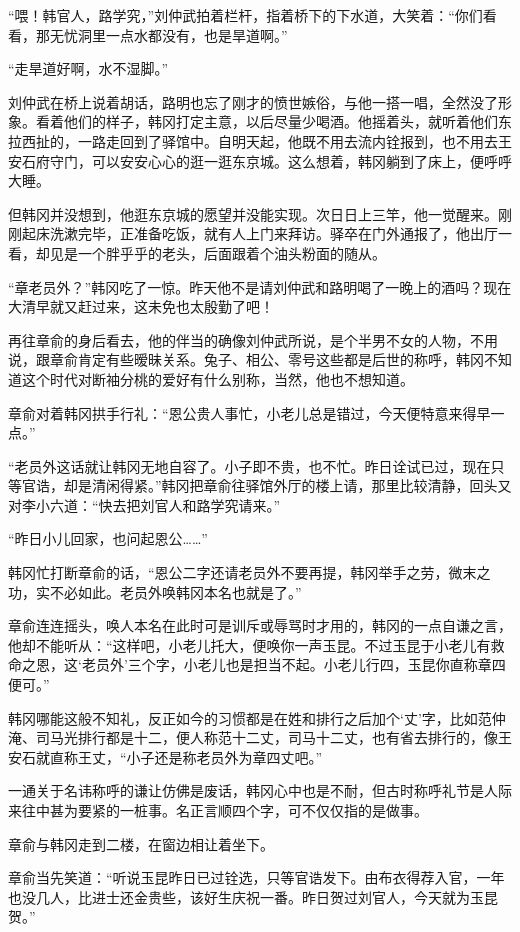 “喂！韩官人，路学究，”刘仲武拍着栏杆，指着桥下的下水道，大笑着：“你们看看，那无忧洞里一点水都没有，也是旱道啊。”

“走旱道好啊，水不湿脚。”

刘仲武在桥上说着胡话，路明也忘了刚才的愤世嫉俗，与他一搭一唱，全然没了形象。看着他们的样子，韩冈打定主意，以后尽量少喝酒。他摇着头，就听着他们东拉西扯的，一路走回到了驿馆中。自明天起，他既不用去流内铨报到，也不用去王安石府守门，可以安安心心的逛一逛东京城。这么想着，韩冈躺到了床上，便呼呼大睡。

但韩冈并没想到，他逛东京城的愿望并没能实现。次日日上三竿，他一觉醒来。刚刚起床洗漱完毕，正准备吃饭，就有人上门来拜访。驿卒在门外通报了，他出厅一看，却见是一个胖乎乎的老头，后面跟着个油头粉面的随从。

“章老员外？”韩冈吃了一惊。昨天他不是请刘仲武和路明喝了一晚上的酒吗？现在大清早就又赶过来，这未免也太殷勤了吧！

再往章俞的身后看去，他的伴当的确像刘仲武所说，是个半男不女的人物，不用说，跟章俞肯定有些暧昧关系。兔子、相公、零号这些都是后世的称呼，韩冈不知道这个时代对断袖分桃的爱好有什么别称，当然，他也不想知道。

章俞对着韩冈拱手行礼：“恩公贵人事忙，小老儿总是错过，今天便特意来得早一点。”

“老员外这话就让韩冈无地自容了。小子即不贵，也不忙。昨日诠试已过，现在只等官诰，却是清闲得紧。”韩冈把章俞往驿馆外厅的楼上请，那里比较清静，回头又对李小六道：“快去把刘官人和路学究请来。”

“昨日小儿回家，也问起恩公……”

韩冈忙打断章俞的话，“恩公二字还请老员外不要再提，韩冈举手之劳，微末之功，实不必如此。老员外唤韩冈本名也就是了。”

章俞连连摇头，唤人本名在此时可是训斥或辱骂时才用的，韩冈的一点自谦之言，他却不能听从：“这样吧，小老儿托大，便唤你一声玉昆。不过玉昆于小老儿有救命之恩，这‘老员外’三个字，小老儿也是担当不起。小老儿行四，玉昆你直称章四便可。”

韩冈哪能这般不知礼，反正如今的习惯都是在姓和排行之后加个‘丈’字，比如范仲淹、司马光排行都是十二，便人称范十二丈，司马十二丈，也有省去排行的，像王安石就直称王丈，“小子还是称老员外为章四丈吧。”

一通关于名讳称呼的谦让仿佛是废话，韩冈心中也是不耐，但古时称呼礼节是人际来往中甚为要紧的一桩事。名正言顺四个字，可不仅仅指的是做事。

章俞与韩冈走到二楼，在窗边相让着坐下。

章俞当先笑道：“听说玉昆昨日已过铨选，只等官诰发下。由布衣得荐入官，一年也没几人，比进士还金贵些，该好生庆祝一番。昨日贺过刘官人，今天就为玉昆贺。”

